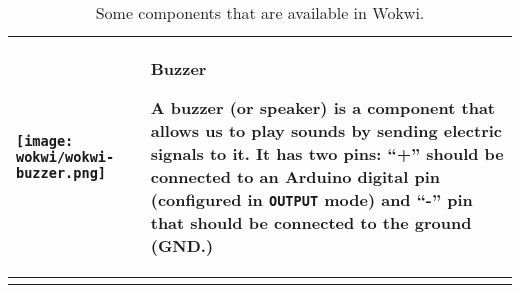 \documentclass[../sparc.tex]{subfiles}
\begin{document}
\begin{longtable}{|>{
      \centering\arraybackslash
    }p{3cm}|>{
      \centering\arraybackslash}p{8cm}|
  }
  \parbox[t][1,8cm][c]{2cm}{\centering \vspace{1cm}
    \texttt{[image: wokwi/wokwi-buzzer.png]}} &
  \parbox[t][3.6cm][t]{8cm}{
    \centering \textbf{Buzzer}\\ \raggedright

    A buzzer (or speaker) is a component that allows us to play sounds by
    sending electric signals to it.  It has two pins: ``+'' should be connected
    to an Arduino digital pin (configured in \texttt{OUTPUT} mode) and ``-'' pin
    that should be connected to the ground (GND.)

  } \\  \hline

  \caption{Some components that are available in Wokwi.}
\end{longtable}
\end{document}
